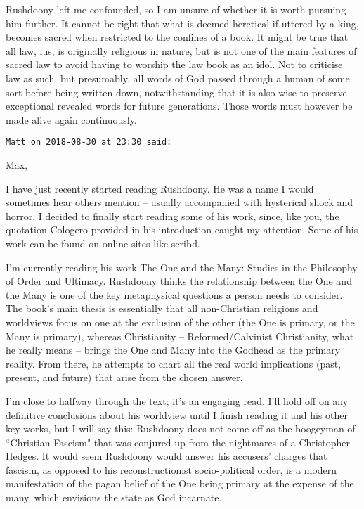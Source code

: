 \begin{footnotesize}
\begin{sffamily}
Rushdoony left me confounded, so I am unsure of whether it is worth pursuing him further. It cannot be right that what is deemed heretical if uttered by a king, becomes sacred when restricted to the confines of a book. It might be true that all law, ius, is originally religious in nature, but is not one of the main features of sacred law to avoid having to worship the law book as an idol. Not to criticise law as such, but presumably, all words of God passed through a human of some sort before being written down, notwithstanding that it is also wise to preserve exceptional revealed words for future generations. Those words must however be made alive again continuously.


\hfill

\texttt{Matt on 2018-08-30 at 23:30 said: }

Max,

I have just recently started reading Rushdoony. He was a name I would sometimes hear others mention – usually accompanied with hysterical shock and horror. I decided to finally start reading some of his work, since, like you, the quotation Cologero provided in his introduction caught my attention. Some of his work can be found on online sites like scribd. 

I'm currently reading his work The One and the Many: Studies in the Philosophy of Order and Ultimacy. Rushdoony thinks the relationship between the One and the Many is one of the key metaphysical questions a person needs to consider. The book's main thesis is essentially that all non-Christian religions and worldviews focus on one at the exclusion of the other (the One is primary, or the Many is primary), whereas Christianity – Reformed/Calvinist Christianity, what he really means – brings the One and Many into the Godhead as the primary reality. From there, he attempts to chart all the real world implications (past, present, and future) that arise from the chosen answer.

I'm close to halfway through the text; it's an engaging read. I'll hold off on any definitive conclusions about his worldview until I finish reading it and his other key works, but I will say this: Rushdoony does not come off as the boogeyman of ``Christian Fascism" that was conjured up from the nightmares of a Christopher Hedges. It would seem Rushdoony would answer his accusers' charges that fascism, as opposed to his reconstructionist socio-political order, is a modern manifestation of the pagan belief of the One being primary at the expense of the many, which envisions the state as God incarnate.


\end{sffamily}
\end{footnotesize}
